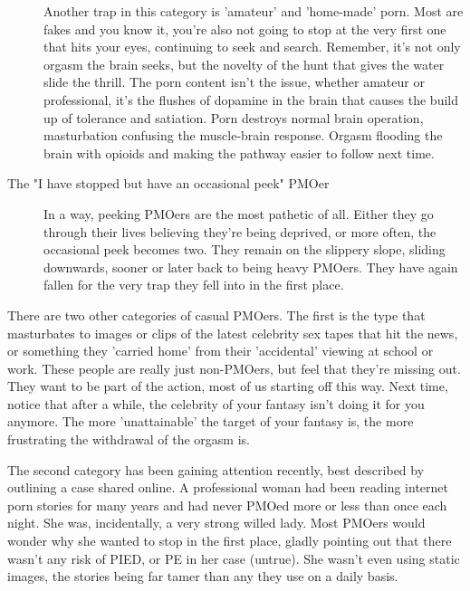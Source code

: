 \documentclass[easypeasy]{subfiles}
\begin{document}
\begin{description}
  Another trap in this category is 'amateur' and 'home-made' porn. Most are fakes and you know it, you're also not going to stop at the very first one that hits your eyes, continuing to seek and search. Remember, it's not only orgasm the brain seeks, but the novelty of the hunt that gives the water slide the thrill. The porn content isn't the issue, whether amateur or professional, it's the flushes of dopamine in the brain that causes the build up of tolerance and satiation. Porn destroys normal brain operation, masturbation confusing the muscle-brain response. Orgasm flooding the brain with opioids and making the pathway easier to follow next time.

\item[The "I have stopped but have an occasional peek" PMOer] In a way, peeking PMOers are the most pathetic of all. Either they go through their lives believing they're being deprived, or more often, the occasional peek becomes two. They remain on the slippery slope, sliding downwards, sooner or later back to being heavy PMOers. They have again fallen for the very trap they fell into in the first place.
 \end{description}

There are two other categories of casual PMOers. The first is the type that masturbates to images or clips of the latest celebrity sex tapes that hit the news, or something they 'carried home' from their 'accidental' viewing at school or work. These people are really just non-PMOers, but feel that they're missing out. They want to be part of the action, most of us starting off this way. Next time, notice that after a while, the celebrity of your fantasy isn't doing it for you anymore. The more 'unattainable' the target of your fantasy is, the more frustrating the withdrawal of the orgasm is.

The second category has been gaining attention recently, best described by outlining a case shared online. A professional woman had been reading internet porn stories for many years and had never PMOed more or less than once each night. She was, incidentally, a very strong willed lady. Most PMOers would wonder why she wanted to stop in the first place, gladly pointing out that there wasn't any risk of PIED, or PE in her case (untrue). She wasn't even using static images, the stories being far tamer than any they use on a daily basis.
\end{document}
